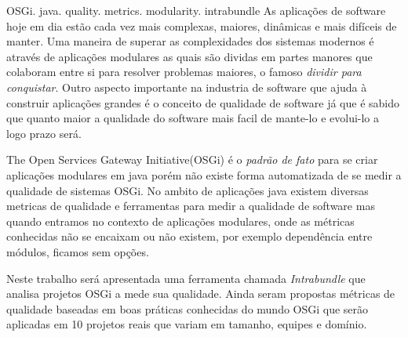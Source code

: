 \begin{englishabstract}{}{OSGi. java. quality. metrics. modularity. intrabundle}
As aplicações de software hoje em dia estão cada vez mais complexas, maiores, dinâmicas e mais difíceis de manter. Uma maneira de superar as complexidades dos sistemas modernos é através de aplicações modulares as quais são dividas em partes manores que colaboram entre si para resolver problemas maiores, o famoso \emph{dividir para conquistar}. Outro aspecto importante na industria de software que ajuda à construir aplicações grandes é o conceito de qualidade de software já que é sabido que quanto maior a qualidade do software mais facil de mante-lo e evolui-lo a logo prazo será.

The Open Services Gateway Initiative(OSGi) é o \emph{padrão de fato} para se criar aplicações modulares em java porém não existe forma automatizada de se medir a qualidade de sistemas OSGi. No ambito de aplicações java existem diversas metricas de qualidade e ferramentas para medir a qualidade de software mas quando entramos no contexto de aplicações modulares, onde as métricas conhecidas não se encaixam ou não existem, por exemplo dependência entre módulos, ficamos sem opções. 

Neste trabalho será apresentada uma ferramenta chamada \emph{Intrabundle} que analisa projetos OSGi a mede sua qualidade. Ainda seram propostas métricas de qualidade baseadas em boas práticas conhecidas do mundo OSGi que serão aplicadas em 10 projetos reais que variam em tamanho, equipes e domínio.
\end{englishabstract}
